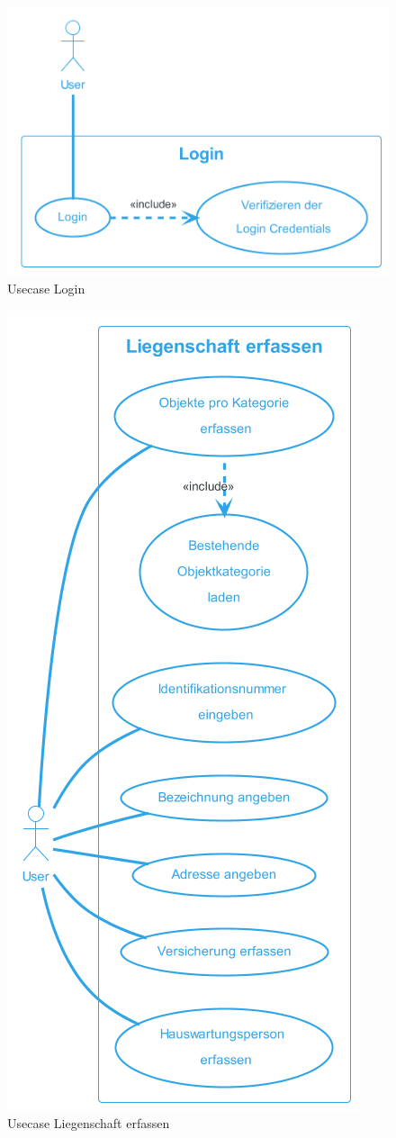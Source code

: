 \begin{figure}[H]
  \begin{center}
    \includegraphics[width=0.6\linewidth]{content/diagrams/out/usecase/login/Login.png}
    \caption{Usecase Login}
  \end{center}
  \label{login}
\end{figure}

\begin{figure}[H]
  \begin{center}
    \includegraphics[width=0.5\linewidth]{content/diagrams/out/usecase/liegenschaftErfassen/LiegenschaftErfassen.png}
    \caption{Usecase Liegenschaft erfassen}
  \end{center}
  \label{Liegenschaft}
\end{figure}

